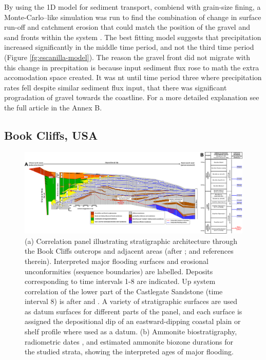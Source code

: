 By using the 1D model for sediment transport, combiend with grain-size fining, a Monte-Carlo--like simulation was run to find the combination of change in surface run-off and catchment erosion that could match the position of the gravel and sand fronts within the system \citep{armitage-etal-jsr-2015}. The best fitting model suggests that precipitation increased significantly in the middle time period, and not the third time period (Figure \ref{fg:escanilla-model}). The reason the gravel front did not migrate with this change in precpitation is because input sediment flux rose to math the extra accomodation space created. It was nt until time period three where precipitation rates fell despite similar sediment flux input, that there was significant progradation of gravel towards the coastline. For a more detailed explanation see the full article in the Annex B.

\subsection{Book Cliffs, USA}

\begin{figure}
\includegraphics[width=\textwidth]{./figures/ch2-bookcliffs.pdf}
\caption{(a) Correlation panel illustrating stratigraphic architecture through the Book Cliffs outcrops and adjacent areas (after \citealp{horton-etal-2004,hampson-2010,hampson-etal-2014}; and references therein). Interpreted major flooding surfaces and erosional unconformities (sequence boundaries) are labelled. Deposits corresponding to time intervals 1-8 are indicated. Up system correlation of the lower part of the Castlegate Sandstone (time interval 8) is after \cite{robinson-1998} and \cite{mclaurin-2000}. A variety of stratigraphic surfaces are used as datum surfaces for different parts of the panel, and each surface is assigned the depositional dip of an eastward-dipping coastal plain or shelf profile where used as a datum. (b) Ammonite biostratigraphy, radiometric dates \citep{obradovich-1993}, and estimated ammonite biozone durations \citep{krystinik-1995} for the studied strata, showing the interpreted ages of major flooding.}
\label{fg:bookcliffs}
\end{figure}

